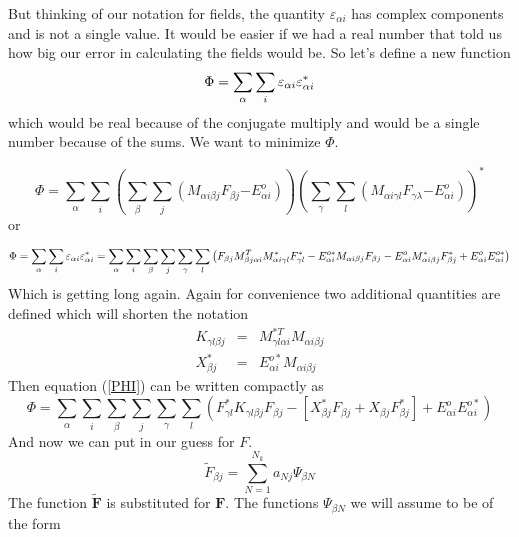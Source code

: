 \documentclass{article}
\begin{document}
But thinking of our notation for fields, the quantity $\varepsilon _{\alpha
i}$ has complex components and is not a single value. It would be easier if
we had a real number that told us how big our error in calculating the
fields would be. So let's define a new function  
\begin{equation*}
\Phi =\sum_{\alpha }\sum_{i}\mathbf{\varepsilon }_{\alpha i}\mathbf{%
\varepsilon }_{\alpha i}^{\ast }
\end{equation*}%
which would be real because of the conjugate multiply and would be a single
number because of the sums. We want to minimize $\Phi .$

\begin{equation}
\Phi =\sum_{\alpha }\sum_{i}\left( \sum_{\beta }\sum_{j}\left( M_{\alpha
i\beta j}F_{\beta j}\mathbf{-}E_{\alpha i}^{o}\right) \right) \left(
\sum_{\gamma }\sum_{l}\left( M_{\alpha i\gamma l}F_{\gamma \lambda }\mathbf{-%
}E_{\alpha i}^{o}\right) \right) ^{\ast }
\end{equation}%
or

\begin{equation}
\Phi =\sum_{\alpha }\sum_{i}\mathbf{\varepsilon }_{\alpha i}\mathbf{%
\varepsilon }_{\alpha i}^{\ast }=\sum_{\alpha }\sum_{i}\sum_{\beta
}\sum_{j}\sum_{\gamma }\sum_{l}\left( F_{\beta j}M_{\beta j\alpha
i}^{T}M_{\alpha i\gamma l}^{\ast }F_{\gamma l}^{\ast }-E_{\alpha i}^{o\ast
}M_{\alpha i\beta j}F_{\beta j}-E_{\alpha i}^{o}M_{\alpha i\beta j}^{\ast
}F_{\beta j}^{\ast }+E_{\alpha i}^{o}E_{\alpha i}^{o\ast }\right) 
\label{PHI}
\end{equation}%
Which is getting long again. Again for convenience two additional quantities
are defined which will shorten the notation 
\begin{eqnarray}
K_{\gamma l\beta j} &=&M_{\gamma l\alpha i}^{\ast T}M_{\alpha i\beta j} \\
X_{\beta j}^{\ast } &=&E_{\alpha i}^{o\ast }M_{\alpha i\beta j}
\end{eqnarray}%
Then equation (\ref{PHI}) can be written compactly as 
\begin{equation}
\Phi =\sum_{\alpha }\sum_{i}\sum_{\beta }\sum_{j}\sum_{\gamma
}\sum_{l}\left( F_{\gamma l}^{\ast }K_{\gamma l\beta j}F_{\beta j}-\left[
X_{\beta j}^{\ast }F_{\beta j}+X_{\beta j}F_{\beta j}^{\ast }\right]
+E_{\alpha i}^{o}E_{\alpha i}^{o\ast }\right) 
\end{equation}%
And now we can put in our guess for $F.$ 
\begin{equation}
\tilde{F}_{\beta j}\mathbf{=}\sum_{N=1}^{N_{k}}a_{Nj}\Psi _{\beta N}
\end{equation}
The function $\mathbf{\tilde{F}}$ is substituted for $\mathbf{F.}$ The
functions $\Psi _{\beta N}$ we will assume to be of the form
\end{document}
